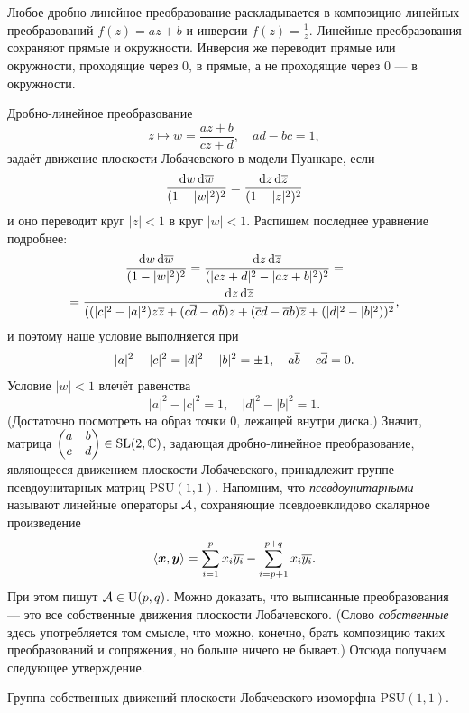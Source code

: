 \begin{secondproof}
	Любое дробно-линейное преобразование раскладывается в композицию линейных преобразований $f(z) = az + b$ и инверсии $f(z) = \frac{1}{z}$. Линейные преобразования сохраняют прямые и окружности. Инверсия же переводит прямые или окружности, проходящие через $0$, в прямые, а не проходящие через $0$ --- в окружности.
\end{secondproof}

Дробно-линейное преобразование
\[
	z \mapsto w = \frac{az + b}{cz + d},\quad ad - bc = 1,
\]
задаёт движение плоскости Лобачевского в модели Пуанкаре, если
\[
	\frac{\mathop{}\!\mathrm{d} w\mathop{}\!\mathrm{d}\overline{w}}{(1 - |w|^2)^2} = \frac{\mathop{}\!\mathrm{d} z\mathop{}\!\mathrm{d}\overline{z}}{(1 - |z|^2)^2}
\]
и оно переводит круг $|z| < 1$ в круг $|w| < 1$. Распишем последнее уравнение подробнее:
\begin{multline*}
	\frac{\mathop{}\!\mathrm{d} w\mathop{}\!\mathrm{d}\overline{w}}{(1 - |w|^2)^2} = \frac{\mathop{}\!\mathrm{d} z\mathop{}\!\mathrm{d}\overline{z}}{(|cz + d|^2 - |az + b|^2)^2} =\\ = \frac{\mathop{}\!\mathrm{d} z\mathop{}\!\mathrm{d}\overline{z}}{((|c|^2 - |a|^2)z\overline{z} + (c\overline{d} - a\overline{b})z + (\overline{c}d - \overline{a}b)\overline{z} + (|d|^2 - |b|^2))^2},
\end{multline*}
и поэтому наше условие выполняется при
\[
	|a|^2 - |c|^2 = |d|^2 - |b|^2 = \pm 1,\quad a\overline{b} - c\overline{d} = 0.
\]
Условие $|w| < 1$ влечёт равенства
\[
	|a|^2 - |c|^2 = 1,\quad |d|^2 - |b|^2 = 1.
\]
(Достаточно посмотреть на образ точки $0$, лежащей внутри диска.) Значит, матрица
$\begin{pmatrix}
	a & b\\
	c & d
\end{pmatrix} \in \mathrm{SL}(2, \mathbb{C})$, задающая дробно-линейное преобразование, являющееся движением плоскости Лобачевского, принадлежит группе псевдоунитарных матриц $\mathrm{PSU}(1, 1)$. Напомним, что \textit{псевдоунитарными} называют линейные операторы $\mathcal{A}$, сохраняющие псевдоевклидово скалярное произведение
\[
	\langle\boldsymbol{x}, \boldsymbol{y}\rangle = \sum_{i = 1}^px_i\overline{y_i} - \sum_{i = p + 1}^{p + q}x_i\overline{y_i}.
\]
При этом пишут $\mathcal{A} \in \mathrm{U}(p, q)$. Можно доказать, что выписанные преобразования --- это все собственные движения плоскости Лобачевского. (Слово \textit{собственные} здесь употребляется том смысле, что можно, конечно, брать композицию таких преобразований и сопряжения, но больше ничего не бывает.) Отсюда получаем следующее утверждение.

\begin{theorem}
	Группа собственных движений плоскости Лобачевского изоморфна $\mathrm{PSU}(1, 1)$.
\end{theorem}


